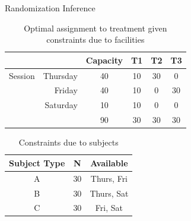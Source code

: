 \documentclass[
  11pt,
  ignorenonframetext,
]{beamer}
\begin{document}
\begin{frame}{Randomization Inference}
\protect\hypertarget{randomization-inference-5}{}
\begin{table}
  \centering
  \caption{Optimal assignment to treatment given constraints due to facilities}
    \begin{tabular}{rrcccc}
          &       & Capacity & T1    & T2    & T3 \\ \hline
    Session & Thursday & 40    & 10    & 30    & 0 \\
          & Friday & 40    & 10    & 0     & 30 \\
          & Saturday & 10    & 10    & 0     & 0 \\ \hline
          &       & 90    & 30    & 30    & 30 \\ \hline
    \end{tabular}
\end{table}

\begin{table}[htbp] \small
  \centering
  \caption{Constraints due to subjects}
    \begin{tabular}{ccc}
    Subject Type & N     & Available \\ \hline
    A     & 30    & Thurs, Fri \\
    B     & 30    & Thurs, Sat \\
    C     & 30    & Fri, Sat \\ \hline
    \end{tabular}
\end{table}
\end{frame}
\end{document}
